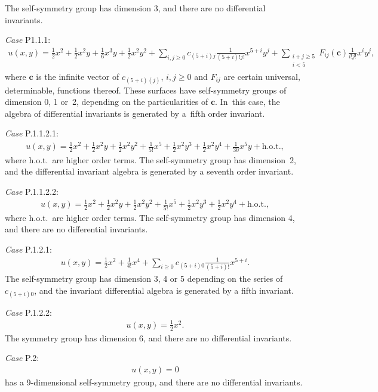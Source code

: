\documentclass[10pt,a4paper]{amsart}
\numberwithin{equation}{section}
\begin{document}
The self-symmetry group has dimension 3, and there are no differential invariants.

{\it Case} P1.1.1:
\begin{gather*}
u(x,y)=\frac{1}{2}x^2+\frac{1}{2}x^2y+\frac{1}{6}x^3y+\frac{1}{2}x^2y^2
+\sum_{i,j\geq 0}c_{(5+i)j}\frac{1}{(5+i)!j!}x^{5+i}y^{j}
+\!\!\sum_{\substack{ i+j\geq 5 \\ i<5}}\!F_{ij}(\mathbf{c})\frac{1}{i!j!}x^iy^j,
\end{gather*}
where $\mathbf{c}$ is the infinite vector of $c_{(5+i)(j)}$, $i,j\geq0$ and $F_{ij}$ are certain universal, determinable, functions thereof. These surfaces have self-symmetry groups of dimension 0, 1 or~2, depending on the particularities of $\mathbf{c}$. In~this case, the algebra of differential invariants is generated by a~fifth order invariant.

{\it Case} P.1.1.2.1:
\begin{gather*}
u(x,y) = \frac{1}{2}x^2+\frac{1}{2}x^2y+\frac{1}{2}x^2y^2+\frac{1}{5!}x^5+\frac{1}{2}x^2y^3+\frac{1}{2}x^2y^4 + \frac{1}{30} x^5y + \text{h.o.t.},
\end{gather*}
where h.o.t.\ are higher order terms. The self-symmetry group has dimension~2, and the diffe\-ren\-tial invariant algebra is generated by a seventh order invariant.

{\it Case} P.1.1.2.2:
\begin{gather*}
u(x,y)=\frac{1}{2}x^2+\frac{1}{2}x^2y+\frac{1}{2}x^2y^2+\frac{1}{5!}x^5+\frac{1}{2}x^2y^3+\frac{1}{2}x^2y^4 +\text{h.o.t.},
\end{gather*}
where h.o.t.\ are higher order terms. The self-symmetry group has dimension 4, and there are no differential invariants.

{\it Case} P.1.2.1:
\begin{gather*}
u(x,y)=\frac{1}{2}x^2+\frac{1}{4!}x^4+\sum_{i\geq 0}c_{(5+i)0}\frac{1}{(5+i)!}x^{5+i}.
\end{gather*}
The self-symmetry group has dimension 3, 4 or 5 depending on the series of $c_{(5+i)0}$, and the invariant differential algebra is generated by a fifth invariant.

{\it Case} P.1.2.2:
\begin{gather*}
u(x,y)=\frac{1}{2}x^2.
\end{gather*}
The symmetry group has dimension 6, and there are no differential invariants.

{\it Case} P.2:
\begin{gather*}
u(x,y)=0
\end{gather*}
has a 9-dimensional self-symmetry group, and there are no differential invariants.
\end{document}
